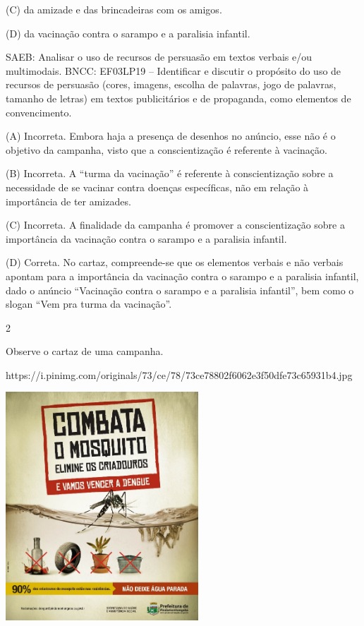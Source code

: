 \begin{boxlist}
{(C) da amizade e das brincadeiras com os amigos.

(D) da vacinação contra o sarampo e a paralisia infantil.

SAEB: Analisar o uso de recursos de persuasão em textos verbais e/ou multimodais.
BNCC: EF03LP19 -- Identificar e discutir o propósito do uso de recursos de
persuasão (cores, imagens, escolha de palavras, jogo de palavras,
tamanho de letras) em textos publicitários e de propaganda, como
elementos de convencimento.

(A) Incorreta. Embora haja a presença de desenhos no anúncio, esse não é
o objetivo da campanha, visto que a conscientização é referente à
vacinação.

(B) Incorreta. A ``turma da vacinação'' é referente à conscientização
sobre a necessidade de se vacinar contra doenças específicas, não em
relação à importância de ter amizades.

(C) Incorreta. A finalidade da campanha é promover a conscientização sobre a
importância da vacinação contra o sarampo e a paralisia infantil.

(D) Correta. No cartaz, compreende-se que os elementos verbais e não
verbais apontam para a importância da vacinação contra o sarampo e a
paralisia infantil, dado o anúncio ``Vacinação contra o sarampo e a
paralisia infantil'', bem como o slogan ``Vem pra turma da vacinação''.

\num{2}

Observe o cartaz de uma campanha.

https://i.pinimg.com/originals/73/ce/78/73ce78802f6062e3f50dfe73c65931b4.jpg

\includegraphics[width=2.84375in,height=3.36642in]{media/image13.jpeg}

}
\end{boxlist}
